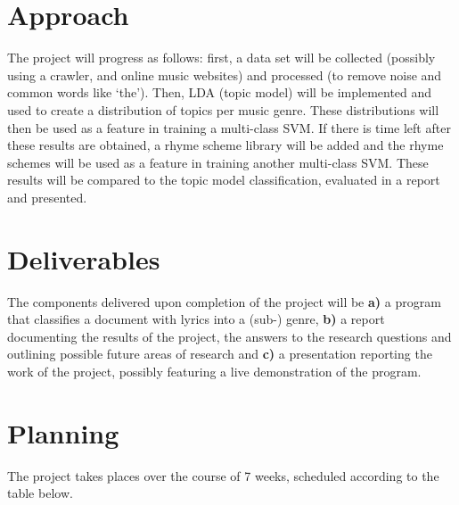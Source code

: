 \documentclass[12pt,a4paper]{amsart}
\begin{document}
\section{Approach}
The project will progress as follows: first, a data set will be collected (possibly using a crawler, and online music websites) and processed (to remove noise and common words like `the'). Then, LDA (topic model) will be implemented and used to create a distribution of topics per music genre. These distributions will then be used as a feature in training a multi-class SVM. If there is time left after these results are obtained, a rhyme scheme library will be added and the rhyme schemes will be used as a feature in training another multi-class SVM. These results will be compared to the topic model classification, evaluated in a report and presented.

\section{Deliverables}
The components delivered upon completion of the project will be \textbf{a)} a program that classifies a document with lyrics into a (sub-) genre, \textbf{b)} a report documenting the results of the project, the answers to the research questions and outlining possible future areas of research and \textbf{c)} a presentation reporting the work of the project, possibly featuring a live demonstration of the program.
\section{Planning}
The project takes places over the course of 7 weeks, scheduled according to the table below.\\
\begin{center}
\\
\end{center}


\end{document}
